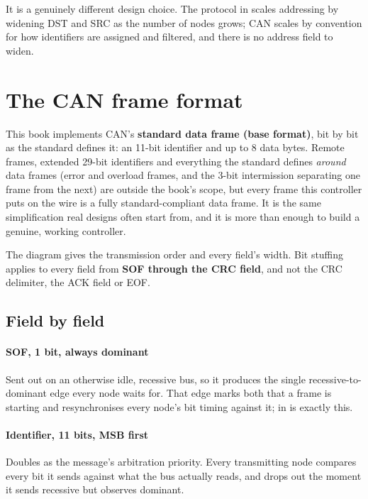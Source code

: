It is a genuinely different design choice. The protocol in  scales addressing
by widening DST and SRC as the number of nodes grows; CAN scales by convention for how identifiers
are assigned and filtered, and there is no address field to widen.

\section{The CAN frame format}
\label{c10:sec:frameformat}


This book implements CAN's \textbf{standard data frame (base format)}, bit by bit as the standard
defines it: an 11-bit identifier and up to 8 data bytes. Remote frames, extended 29-bit identifiers
and everything the standard defines \emph{around} data frames (error and overload frames, and the
3-bit intermission separating one frame from the next) are outside the book's scope, but every frame
this controller puts on the wire is a fully standard-compliant data frame. It is the same
simplification real designs often start from, and it is more than enough to build a genuine, working
controller.

The diagram gives the transmission order and every field's width. Bit stuffing applies to every field
from \textbf{SOF through the CRC field}, and not the CRC delimiter, the ACK field or EOF.

\subsection*{Field by field}
\paragraph{SOF, 1 bit, always dominant}
Sent out on an otherwise idle, recessive bus, so it produces the single recessive-to-dominant edge
every node waits for. That edge marks both that a frame is starting and resynchronises every node's
bit timing against it;  in  is exactly this.

\paragraph{Identifier, 11 bits, MSB first}
Doubles as the message's arbitration priority. Every transmitting node compares every bit it sends
against what the bus actually reads, and drops out the moment it sends recessive but observes
dominant.

